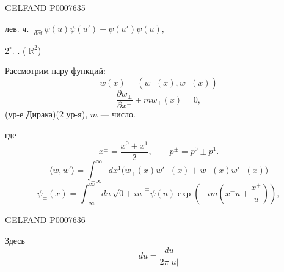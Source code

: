 \begin{GelfandAdjacentEvidence}{GELFAND-P000763}{5}


лев. ч. \(\underset{\mathrm{def}}{=}\psi(u)\psi(u')+\psi(u')\psi(u),\)

\(2^\circ\). . ( \(\mathbb R^2\))

Рассмотрим пару функций:
\[
w(x)=(w_+(x),w_-(x))
\]
\begin{equation*}
\tag{3}
\frac{\partial w_\pm}{\partial x^\pm}\mp m w_\mp(x)=0,
\end{equation*}
(ур-е Дирака)\qquad (2 ур-я), \(m\) --- число.

где
\[
x^\pm=\frac{x^0\pm x^1}{2},\qquad p^\pm=p^0\pm p^1.
\]
\begin{equation*}
\tag{4}
\langle w,w'\rangle=\int_{-\infty}^{\infty}dx^1
\bigl(w_+(x)w'_+(x)+w_-(x)w'_-(x)\bigr)
\end{equation*}
\begin{equation*}
\tag{5}
\psi_\pm(x)=\int_{-\infty}^{\infty}\underline{du}\,
\sqrt{0+iu}^{\,\pm}\psi(u)
\exp\!\left(-im\left(x^-u+\frac{x^+}{u}\right)\right),
\end{equation*}
\end{GelfandAdjacentEvidence}
\begin{GelfandAdjacentEvidence}{GELFAND-P000763}{6}


\end{GelfandAdjacentEvidence}


Здесь
\[
\underline{du}=\frac{du}{2\pi|u|}
\]


